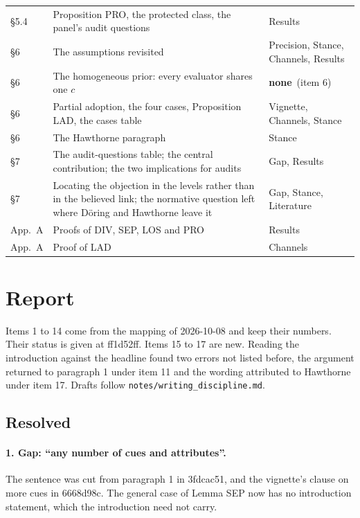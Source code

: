 \documentclass[11pt,a4paper]{article}
\newcommand{\none}{\textbf{none}}
\begin{document}
\begin{longtable}{@{}p{1.7cm}p{9.6cm}p{4.0cm}@{}}
\S5.4 & Proposition PRO, the protected class, the panel's audit questions & Results\\
\addlinespace
\S6 & The assumptions revisited & Precision, Stance, Channels, Results\\
\S6 & The homogeneous prior: every evaluator shares one $c$ & \none\ (item 6)\\
\S6 & Partial adoption, the four cases, Proposition LAD, the cases table & Vignette, Channels, Stance\\
\S6 & The Hawthorne paragraph & Stance\\
\addlinespace
\S7 & The audit-questions table; the central contribution; the two implications for audits & Gap, Results\\
\S7 & Locating the objection in the levels rather than in the believed link; the normative question left where Döring and Hawthorne leave it & Gap, Stance, Literature\\
\addlinespace
App.~A & Proofs of DIV, SEP, LOS and PRO & Results\\
App.~A & Proof of LAD & Channels\\
\end{longtable}
\normalsize

\section{Report}\label{sec:findings}

Items 1 to 14 come from the mapping of 2026-10-08 and keep their numbers. Their status is given
at ff1d52ff. Items 15 to 17 are new. Reading the introduction against the headline found two
errors not listed before, the argument returned to paragraph 1 under item 11 and the wording
attributed to Hawthorne under item 17. Drafts
follow \texttt{notes/writing\_discipline.md}.

\subsection*{Resolved}

\paragraph{1. Gap: ``any number of cues and attributes''.} The sentence was cut from paragraph 1
in 3fdcac51, and the vignette's clause on more cues in 6668d98c. The general case of Lemma SEP now
has no introduction statement, which the introduction need not carry.
\end{document}
